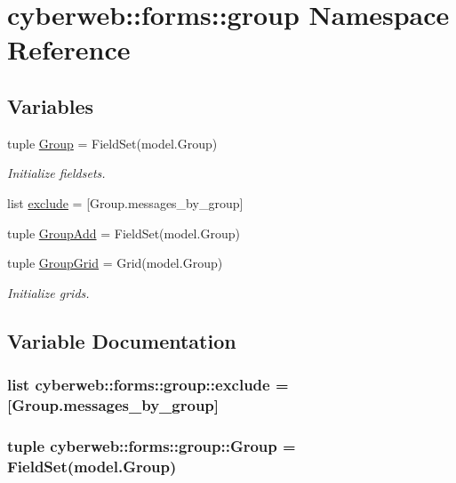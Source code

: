 \hypertarget{namespacecyberweb_1_1forms_1_1group}{\section{cyberweb\-:\-:forms\-:\-:group \-Namespace \-Reference}
\label{namespacecyberweb_1_1forms_1_1group}
}
\subsection*{\-Variables}
\begin{DoxyCompactItemize}
\item 
tuple \hyperlink{namespacecyberweb_1_1forms_1_1group_a7337b92e5c12091b181af0d17d9a93c7}{\-Group} = \-Field\-Set(model.\-Group)
\begin{DoxyCompactList}\small\item\em \-Initialize fieldsets. \end{DoxyCompactList}\item 
list \hyperlink{namespacecyberweb_1_1forms_1_1group_a510b9489c4c9fd1ff636fda064d1f2bd}{exclude} = \mbox{[}\-Group.\-messages\-\_\-by\-\_\-group\mbox{]}
\item 
tuple \hyperlink{namespacecyberweb_1_1forms_1_1group_a550920d4198bf95854547a1dc0e2625f}{\-Group\-Add} = \-Field\-Set(model.\-Group)
\item 
tuple \hyperlink{namespacecyberweb_1_1forms_1_1group_a19ddad2ed814644111700e4e810d5bff}{\-Group\-Grid} = \-Grid(model.\-Group)
\begin{DoxyCompactList}\small\item\em \-Initialize grids. \end{DoxyCompactList}\end{DoxyCompactItemize}


\subsection{\-Variable \-Documentation}
\hypertarget{namespacecyberweb_1_1forms_1_1group_a510b9489c4c9fd1ff636fda064d1f2bd}{
\subsubsection[{exclude}]{\setlength{\rightskip}{0pt plus 5cm}list {\bf cyberweb\-::forms\-::group\-::exclude} = \mbox{[}\-Group.\-messages\-\_\-by\-\_\-group\mbox{]}}}\label{namespacecyberweb_1_1forms_1_1group_a510b9489c4c9fd1ff636fda064d1f2bd}
\hypertarget{namespacecyberweb_1_1forms_1_1group_a7337b92e5c12091b181af0d17d9a93c7}{
\subsubsection[{\-Group}]{\setlength{\rightskip}{0pt plus 5cm}tuple {\bf cyberweb\-::forms\-::group\-::\-Group} = \-Field\-Set(model.\-Group)}}\label{namespacecyberweb_1_1forms_1_1group_a7337b92e5c12091b181af0d17d9a93c7}


